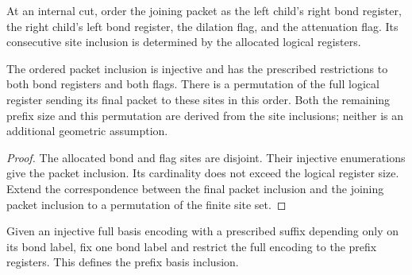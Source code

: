 \begin{definition}
    \label{def:mpu_actual_joining_packet}
    \leanok
    At an internal cut, order the joining packet as the left child's
    right bond register, the right child's left bond register, the
    dilation flag, and the attenuation flag. Its consecutive site
    inclusion is determined by the allocated logical registers.
\end{definition}

\begin{lemma}
    \label{thm:mpu_actual_joining_packet}
    \leanok
    The ordered packet inclusion is injective and has the prescribed
    restrictions to both bond registers and both flags. There is a
    permutation of the full logical register sending its final packet
    to these sites in this order. Both the remaining
    prefix size and this permutation are derived from the site
    inclusions; neither is an additional geometric assumption.
\end{lemma}
\begin{proof}\leanok
    The allocated bond and flag sites are disjoint. Their injective
    enumerations give the packet inclusion. Its cardinality does not
    exceed the logical register size. Extend the correspondence
    between the final packet inclusion and the joining packet inclusion
    to a permutation of the finite site set.
\end{proof}

\begin{definition}
    \label{def:mpu_prefix_basis_encoding}
    \leanok
    Given an injective full basis encoding with a prescribed suffix
    depending only on its bond label, fix one bond label and restrict
    the full encoding to the prefix registers. This defines the
    prefix basis inclusion.
\end{definition}

